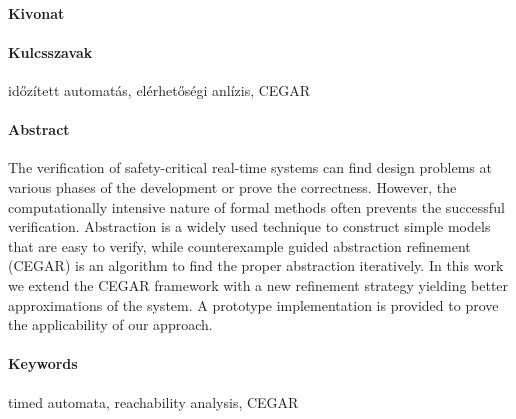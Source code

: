 \begin{otherlanguage}{magyar}

  \paragraph*{Kivonat}
  \thispagestyle{plain}


  \paragraph{Kulcsszavak} időzített automatás, elérhetőségi anlízis, CEGAR
\end{otherlanguage}

\cleardoublepage

\paragraph*{Abstract}
{}
\thispagestyle{plain}

The verification of safety-critical real-time systems can find design problems at various phases of the development or prove the correctness. However, 
the computationally intensive nature of formal methods often prevents the successful verification. Abstraction is a widely used technique to construct simple models that are easy to verify, while counterexample guided abstraction refinement (CEGAR) is an algorithm to find the proper abstraction iteratively. In this work we extend the CEGAR framework with a new refinement strategy yielding better approximations of the system. A prototype implementation is provided to prove the applicability of our approach.


\paragraph{Keywords} timed automata, reachability analysis,
CEGAR
